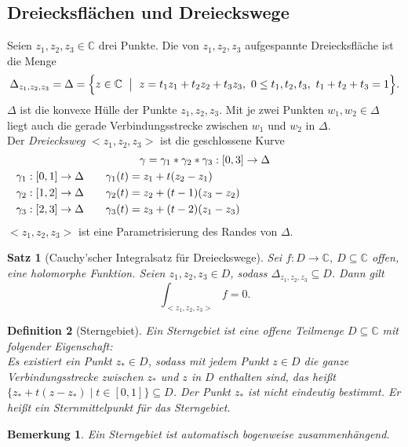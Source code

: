 \documentclass[a4paper,12pt]{book}
\theoremstyle{newthm}
\newtheorem{thm}{Satz}[section]
\theoremstyle{newdef}
\newtheorem{defn}[thm]{Definition}
\theoremstyle{newrem}
\newtheorem*{rem}{Bemerkung}
\newcommand{\C}{\mathbb{C}}
\begin{document}
		\subsection*{Dreiecksflächen und Dreieckswege}
		Seien $ z_1,z_2,z_3 \in \C $ drei Punkte. Die von $ z_1,z_2,z_3 $ aufgespannte Dreiecksfläche ist die Menge
		\[ \Delta_{z_1,z_2,z_3} = \Delta = \Bigl\{ z \in \C \ \bigm|\ z = t_1z_1 + t_2z_2 + t_3z_3,\ 0 \leq t_1,t_2,t_3,\ t_1+t_2+t_3 = 1 \Bigr\}. \]
		$\Delta$ ist die konvexe Hülle der Punkte $ z_1,z_2,z_3 $. Mit je zwei Punkten $ w_1,w_2 \in \Delta $ liegt auch die gerade Verbindungsstrecke zwischen $w_1$ und $w_2$ in $\Delta$.\\
		Der \emph{Dreiecksweg} $ <z_1,z_2,z_3> $ ist die geschlossene Kurve
		\begin{align*}
			\noalign{\centering $\gamma = \gamma_1 * \gamma_2 * \gamma_3: [0,3] \to \Delta$}
			\gamma_1 &: [0,1] \to \Delta \qquad \gamma_1 (t) = z_1 + t(z_2-z_1)\\
			\gamma_2 &: [1,2] \to \Delta \qquad \gamma_2 (t) = z_2 + (t-1)(z_3-z_2)\\
			\gamma_3 &: [2,3] \to \Delta \qquad \gamma_3 (t) = z_3 + (t-2)(z_1 - z_3)
		\end{align*}
		$ <z_1,z_2,z_3> $ ist eine Parametrisierung des Randes von $\Delta$.
			
		\begin{thm}[Cauchy'scher Integralsatz für Dreieckswege]
			Sei $ f: D \to \C,\ D \subseteq \C $ offen, eine holomorphe Funktion. Seien $z_1,z_2,z_3 \in D$, sodass $ \Delta_{z_1,z_2,z_3} \subseteq D $. Dann gilt
			\[ \int_{<z_1,z_2,z_3>} f = 0. \]
		\end{thm}
		\begin{defn}[Sterngebiet]
			Ein \emph{Sterngebiet} ist eine offene Teilmenge $ D \subseteq \C $ mit folgender Eigenschaft:\\
			Es existiert ein Punkt $ z_* \in D $, sodass mit jedem Punkt $ z \in D $ die ganze Verbindungsstrecke zwischen $z_*$ und $z$ in $D$ enthalten sind, das heißt $ \{ z_* + t(z-z_*) \mid t \in [0,1] \} \subseteq D $. Der Punkt $z_*$ ist nicht eindeutig bestimmt. Er heißt ein \emph{Sternmittelpunkt} für das Sterngebiet.
		\end{defn}
		
		\begin{rem}
			Ein Sterngebiet ist automatisch bogenweise zusammenhängend.
		\end{rem}
		
\end{document}
